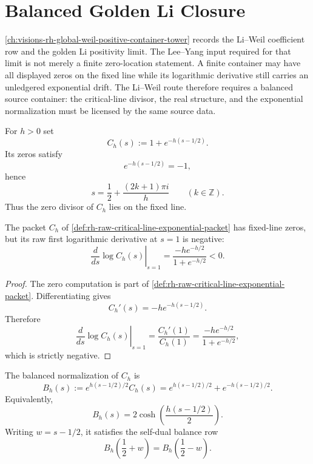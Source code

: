 \chapter{Balanced Golden Li Closure}
\label{ch:visions-rh-balanced-golden-li-closure}

\autoref{ch:visions-rh-global-weil-positive-container-tower} records
the Li--Weil coefficient row and the golden Li positivity limit.  The
Lee--Yang input required for that limit is not merely a finite
zero-location statement.  A finite container may have all displayed
zeros on the fixed line while its logarithmic derivative still carries
an unledgered exponential drift.  The Li--Weil route therefore requires
a balanced source container: the critical-line divisor, the real
structure, and the exponential normalization must be licensed by the
same source data.

\begin{definition}
\label{def:rh-raw-critical-line-exponential-packet}
For $h>0$ set
$$
C_h(s):=1+e^{-h(s-1/2)}.
$$
Its zeros satisfy
$$
e^{-h(s-1/2)}=-1,
$$
hence
$$
s=\frac12+\frac{(2k+1)\pi i}{h}
\qquad
(k\in\mathbb Z).
$$
Thus the zero divisor of $C_h$ lies on the fixed line.
\end{definition}

\begin{lemma}
\label{lem:rh-critical-line-zeros-do-not-force-raw-li-positivity}
The packet $C_h$ of
\autoref{def:rh-raw-critical-line-exponential-packet} has fixed-line
zeros, but its raw first logarithmic derivative at $s=1$ is negative:
$$
\left.
\frac{d}{ds}\log C_h(s)
\right|_{s=1}
=
\frac{-h e^{-h/2}}{1+e^{-h/2}}
<0.
$$
\end{lemma}

\begin{proof}
The zero computation is part of
\autoref{def:rh-raw-critical-line-exponential-packet}.  Differentiating
gives
$$
C_h'(s)=-h e^{-h(s-1/2)}.
$$
Therefore
$$
\left.
\frac{d}{ds}\log C_h(s)
\right|_{s=1}
=
\frac{C_h'(1)}{C_h(1)}
=
\frac{-h e^{-h/2}}{1+e^{-h/2}},
$$
which is strictly negative.
\end{proof}

\begin{definition}
\label{def:rh-balanced-elementary-packet}
The balanced normalization of $C_h$ is
$$
B_h(s)
:=
e^{h(s-1/2)/2}C_h(s)
=
e^{h(s-1/2)/2}+e^{-h(s-1/2)/2}.
$$
Equivalently,
$$
B_h(s)=2\cosh\left(\frac{h(s-1/2)}{2}\right).
$$
Writing $w=s-1/2$, it satisfies the self-dual balance row
$$
B_h\left(\frac12+w\right)
=
B_h\left(\frac12-w\right).
$$
\end{definition}

